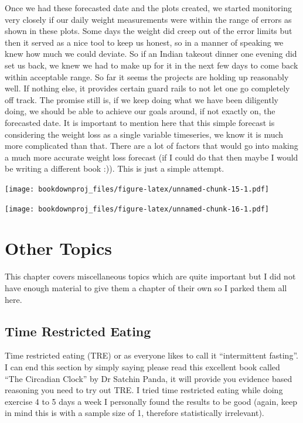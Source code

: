 \documentclass[
  oneside]{book}
\begin{document}
Once we had these forecasted date and the plots created, we started monitoring very closely if our daily weight measurements were within the range of errors as shown in these plots. Some days the weight did creep out of the error limits but then it served as a nice tool to keep us honest, so in a manner of speaking we knew how much we could deviate. So if an Indian takeout dinner one evening did set us back, we knew we had to make up for it in the next few days to come back within acceptable range. So far it seems the projects are holding up reasonably well. If nothing else, it provides certain guard rails to not let one go completely off track. The promise still is, if we keep doing what we have been diligently doing, we should be able to achieve our goals around, if not exactly on, the forecasted date. It is important to mention here that this simple forecast is considering the weight loss as a single variable timeseries, we know it is much more complicated than that. There are a lot of factors that would go into making a much more accurate weight loss forecast (if I could do that then maybe I would be writing a different book :)). This is just a simple attempt.

\texttt{[image: bookdownproj\_files/figure-latex/unnamed-chunk-15-1.pdf]}

\texttt{[image: bookdownproj\_files/figure-latex/unnamed-chunk-16-1.pdf]}

\hypertarget{other-topics}{%
\chapter{Other Topics}\label{other-topics}}

This chapter covers miscellaneous topics which are quite important but I did not have enough material to give them a chapter of their own so I parked them all here.

\hypertarget{time-restricted-eating}{%
\section{Time Restricted Eating}\label{time-restricted-eating}}

Time restricted eating (TRE) or as everyone likes to call it ``intermittent fasting''. I can end this section by simply saying please read this excellent book called ``The Circadian Clock'' by Dr Satchin Panda, it will provide you evidence based reasoning you need to try out TRE. I tried time restricted eating while doing exercise 4 to 5 days a week I personally found the results to be good (again, keep in mind this is with a sample size of 1, therefore statistically irrelevant).
\end{document}
